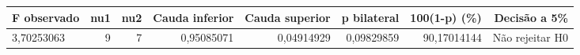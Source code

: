 \begin{tabular}{lrrrrrrr}
\toprule
F observado & nu1 & nu2 & Cauda inferior & Cauda superior & p bilateral & 100(1-p) (\%) & Decisão a 5\% \\
\midrule
3,70253063 & 9 & 7 & 0,95085071 & 0,04914929 & 0,09829859 & 90,17014144 & Não rejeitar H0 \\
\bottomrule
\end{tabular}
